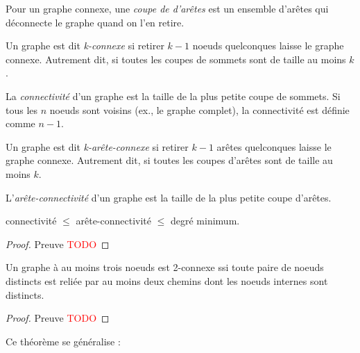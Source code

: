 \begin{mydef}
  Pour un graphe connexe, une \emph{coupe de d'arêtes} est un ensemble d’arêtes qui déconnecte le graphe quand on l’en retire.
\end{mydef}

\begin{mydef}
  Un graphe est dit \emph{k-connexe} si retirer $k − 1$ noeuds quelconques laisse le graphe connexe. Autrement dit, si toutes les coupes de sommets sont de taille au moins $k$.
\end{mydef}

\begin{mydef}
   La \emph{connectivité} d’un graphe est la taille de la plus petite coupe de sommets. Si tous les $n$ noeuds sont voisins (ex., le graphe complet), la connectivité est définie comme $n − 1$.
\end{mydef}

\begin{mydef}
   Un graphe est dit \emph{k-arête-connexe} si retirer $k − 1$ arêtes quelconques laisse le graphe connexe. Autrement dit, si toutes les coupes d’arêtes sont de taille au moins $k$.
\end{mydef}

\begin{mydef}
   L’\emph{arête-connectivité} d’un graphe est la taille de la plus petite coupe d’arêtes.
\end{mydef}

\begin{mytheo}  
  connectivité $\leq$ arête-connectivité $\leq$ degré minimum. %
  \begin{proof}
     Preuve \textcolor{red}{TODO}
  \end{proof}
\end{mytheo}

\begin{mytheo}  
  Un graphe à au moins trois noeuds est 2-connexe ssi toute paire de noeuds distincts est reliée par au moins deux chemins dont les noeuds internes sont distincts.
  \begin{proof}
     Preuve \textcolor{red}{TODO}
  \end{proof}
\end{mytheo}

Ce théorème se généralise :

